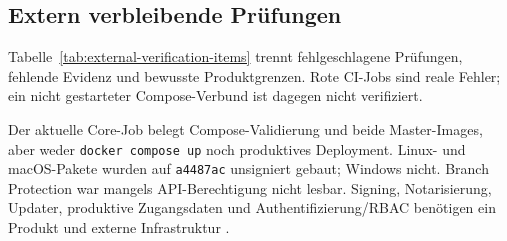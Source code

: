 \subsection{Extern verbleibende Prüfungen}
\label{subsec:extern-verbleibende-pruefungen}

Tabelle~\ref{tab:external-verification-items} trennt fehlgeschlagene Prüfungen,
fehlende Evidenz und bewusste Produktgrenzen. Rote CI-Jobs sind reale Fehler;
ein nicht gestarteter Compose-Verbund ist dagegen nicht verifiziert.

Der aktuelle Core-Job belegt Compose-Validierung und beide Master-Images, aber
weder \texttt{docker compose up} noch produktives Deployment. Linux- und
macOS-Pakete wurden auf \texttt{a4487ac} unsigniert gebaut; Windows nicht.
Branch Protection war mangels API-Berechtigung nicht lesbar. Signing,
Notarisierung, Updater, produktive Zugangsdaten und Authentifizierung/RBAC
benötigen ein Produkt und externe Infrastruktur
\parencite{kleiveist2026ci-core-run,kleiveist2026ci-desktop-run,kleiveist2026release}.


